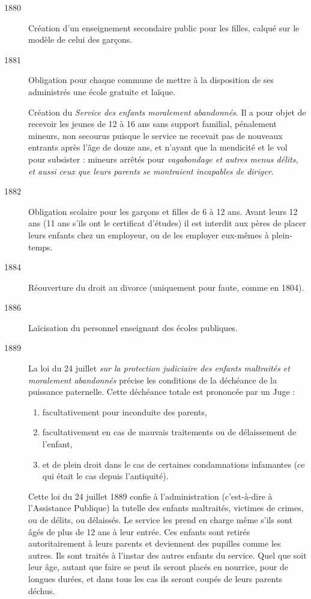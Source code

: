 \begin{description}
\item[1880] Création d'un enseignement secondaire public pour les filles, calqué sur le modèle de celui des garçons. 

\item[1881] Obligation pour chaque commune de mettre à la disposition de ses administrés une école gratuite et laïque.

Création du \emph{Service des enfants moralement abandonnés}. Il a pour objet de recevoir les jeunes de 12 à 16 ans sans support familial, pénalement mineurs, non secourus puisque le service ne recevait pas de nouveaux entrants après l'âge de douze ans, et n'ayant que la mendicité et le vol pour subsister : mineurs arrêtés pour {\emph{vagabondage et autres menus délits, et aussi ceux que leurs parents se montraient incapables de diriger}}.

\item[1882] Obligation scolaire pour les garçons et filles de 6 à 12 ans. Avant leurs 12 ans (11 ans s'ils ont le certificat d'études) il est interdit aux pères de placer leurs enfants chez un employeur, ou de les employer eux-mêmes à plein-temps.

\item[1884] Réouverture du droit au divorce (uniquement pour faute, comme en 1804).

\item[1886] Laïcisation du personnel enseignant des écoles publiques. 

\item[1889] La loi du 24 juillet {\emph{sur la protection judiciaire des enfants maltraités et moralement abandonnés}} précise les conditions de la déchéance de la puissance paternelle. Cette déchéance totale est prononcée par un Juge :
\begin{enumerate}[leftmargin=*,itemsep=0pt]
\item facultativement pour inconduite des parents,
\item facultativement en cas de mauvais traitements ou de délaissement de l'enfant,
\item et de plein droit dans le cas de certaines condamnations infamantes (ce qui était le cas depuis l'antiquité).
\end{enumerate}

Cette loi du 24 juillet 1889 %
confie à l'administration (c'est-à-dire à l'Assistance Publique) la tutelle des enfants maltraités, victimes de crimes, ou de délits, ou délaissés. Le service les prend en charge même s'ils sont âgés de plus de 12 ans à leur entrée. Ces enfants sont retirés autoritairement à leurs parents et deviennent des pupilles comme les autres. Ils sont traités à l'instar des autres enfants du service. Quel que soit leur âge, autant que faire se peut ils seront placés en nourrice, pour de longues durées, et dans tous les cas ils seront coupés de leurs parents déchus.


\end{description}

